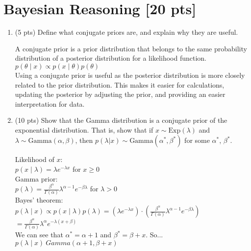 \documentclass[11pt]{article}
\begin{document}
\section{Bayesian Reasoning [20 pts]}
\begin{enumerate}

\item (5 pts) Define what conjugate priors are, and explain why they are useful. \\
\begin{answertext}{3.5cm}{}  

A conjugate prior is a prior distribution that belongs to the same probability distribution of a posterior distribution for a likelihood function. $p(\theta \mid x) \propto p(x \mid \theta)p(\theta)$\\

Using a conjugate prior is useful as the posterior distribution is more closely related to the prior distribution. This makes it easier for calculations, updating the posterior by adjusting the prior, and providing an easier interpretation for data.\\

\end{answertext} 

\item (10 pts) Show that the Gamma distribution is a conjugate prior of the exponential distribution. That is, show that if $x \sim \text{Exp}(\lambda)$ and $\lambda \sim \text{Gamma}(\alpha, \beta)$, then $p(\lambda | x) \sim \text{Gamma}(\alpha^*, \beta^*)$ for some $\alpha^*$, $\beta^*$. \\
\begin{answertext}{6cm}{}

Likelihood of $x$:\\
$p(x \mid \lambda) = \lambda e^{-\lambda x}$ for $x \geq 0$\\
Gamma prior:\\
$p(\lambda) = \frac{\beta^\alpha}{\Gamma(\alpha)}\lambda^{\alpha-1}e^{-\beta\lambda}$ for $\lambda > 0$\\
Bayes' theorem:\\
$p(\lambda \mid x) \propto p(x \mid \lambda)p(\lambda) = (\lambda e^{-\lambda x}) \cdot (\frac{\beta^\alpha}{\Gamma(\alpha)}\lambda^{\alpha-1}e^{-\beta\lambda})$\\
$ = \frac{\beta^\alpha}{\Gamma(\alpha)}\lambda^\alpha e^{-\lambda(x+\beta)}$\\

We can see that $\alpha^* = \alpha + 1$ and $\beta^* = \beta + x$. So...\\
$p(\lambda \mid x) ~ Gamma(\alpha + 1, \beta + x)$


\end{answertext}
\end{enumerate}
\end{document}
